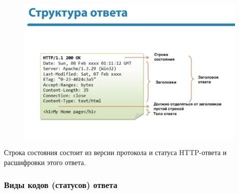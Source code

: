 \documentclass[a4paper,12pt]{article}
\begin{document}
	\begin{figure}[h!]
		\begin{center}
			{\includegraphics[scale = 1]{13.png}}
			\label{13}
		\end{center}
	\end{figure}
	
	Строка состояния состоит из версии протокола и статуса HTTP-ответа и расшифровки этого ответа.
	
	\subsubsection{Виды кодов (статусов) ответа}
	
\end{document}
